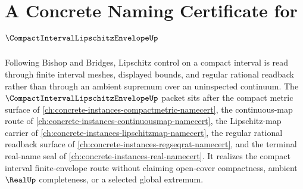 \chapter{A Concrete Naming Certificate for $\CompactIntervalLipschitzEnvelopeUp$}
\label{ch:concrete-instances-compact-interval-lipschitz-envelope-namecert}

Following Bishop and Bridges, Lipschitz control on a compact interval is read through finite interval meshes, displayed bounds, and regular rational readback rather than through an ambient supremum over an uninspected continuum. The $\CompactIntervalLipschitzEnvelopeUp$ packet sits after the compact metric surface of \autoref{ch:concrete-instances-compactmetric-namecert}, the continuous-map route of \autoref{ch:concrete-instances-continuousmap-namecert}, the Lipschitz-map carrier of \autoref{ch:concrete-instances-lipschitzmap-namecert}, the regular rational readback surface of \autoref{ch:concrete-instances-regseqrat-namecert}, and the terminal real-name seal of \autoref{ch:concrete-instances-real-namecert}. It realizes the compact interval finite-envelope route without claiming open-cover compactness, ambient $\RealUp$ completeness, or a selected global extremum.

